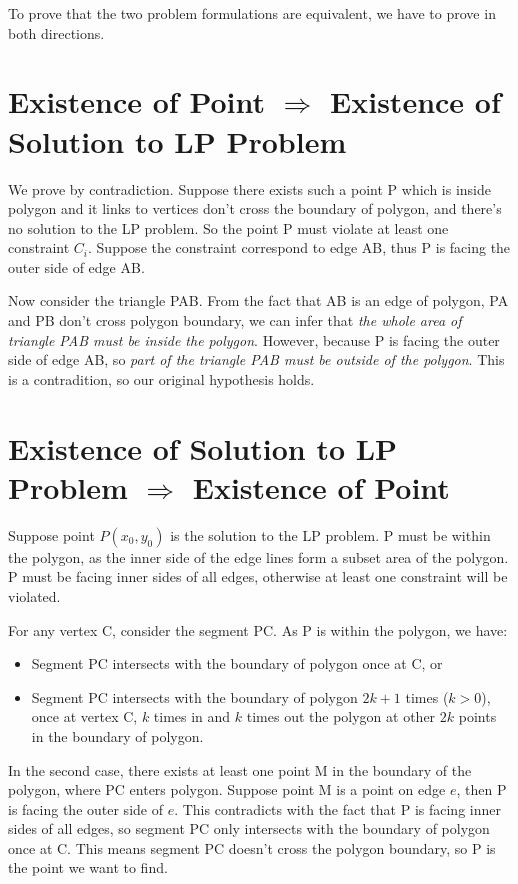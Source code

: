 To prove that the two problem formulations are equivalent, we have to prove in both directions.\\

\section{Existence of Point $\Rightarrow$ Existence of Solution to LP Problem}

We prove by contradiction. Suppose there exists such a point P which is inside polygon and it links to vertices don't cross the boundary of polygon, and there's no solution to the LP problem. So the point P must violate at least one constraint $C_i$. Suppose the constraint correspond to edge AB, thus P is facing the outer side of edge AB.

Now consider the triangle PAB. From the fact that AB is an edge of polygon, PA and PB don't cross polygon boundary, we can infer that \textit{the whole area of triangle PAB must be inside the polygon}. However, because P is facing the outer side of edge AB, so \textit{part of the triangle PAB must be outside of the polygon}. This is a contradition, so our original hypothesis holds.\\

\section{Existence of Solution to LP Problem $\Rightarrow$ Existence of Point}

Suppose point $P(x_0, y_0)$ is the solution to the LP problem. P must be within the polygon, as the inner side of the edge lines form a subset area of the polygon. P must be facing inner sides of all edges, otherwise at least one constraint will be violated.

For any vertex C, consider the segment PC. As P is within the polygon, we have:

\begin{itemize}
  \item Segment PC intersects with the boundary of polygon once at C, or
  \item Segment PC intersects with the boundary of polygon $2k + 1$ times ($k > 0$), once at vertex C, $k$ times in and $k$ times out the polygon at other $2k$ points in the boundary of polygon.
\end{itemize}

In the second case, there exists at least one point M in the boundary of the polygon, where PC enters polygon. Suppose point M is a point on edge $e$, then P is facing the outer side of $e$. This contradicts with the fact that P is facing inner sides of all edges, so segment PC only intersects with the boundary of polygon once at C. This means segment PC doesn't cross the polygon boundary, so P is the point we want to find.
